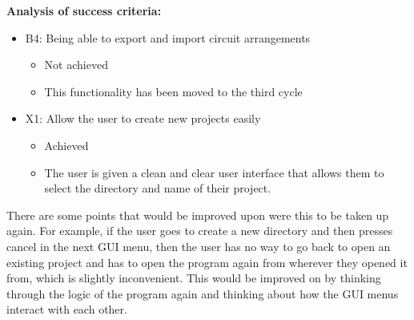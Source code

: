 
    \textbf{Analysis of success criteria:}
    \begin{itemize}
        \item B4: Being able to export and import circuit arrangements
        \begin{itemize}
            \item Not achieved
            \item This functionality has been moved to the third cycle
        \end{itemize}
        \item X1: Allow the user to create new projects easily
        \begin{itemize}
            \item Achieved
            \item The user is given a clean and clear user interface that allows them to select the directory and name of their project.
        \end{itemize}
    \end{itemize}




    There are some points that would be improved upon were this to be taken up again. 
    For example, if the user goes to create a new directory and then presses cancel in the next GUI menu, then the user has no way to go back to open an existing project and has to open the program again from wherever they opened it from, which is slightly inconvenient. 
    This would be improved on by thinking through the logic of the program again and thinking about how the GUI menus interact with each other. 


